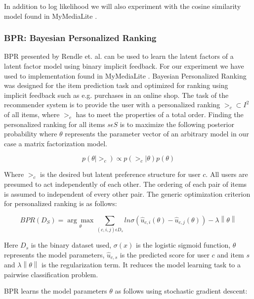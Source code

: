 In addition to log likelihood we will also experiment with the cosine similarity model
found in MyMediaLite \cite{Gantner2011MyMediaLite}.

\subsubsection{BPR: Bayesian Personalized Ranking}

BPR presented by Rendle et. al. \cite{Rendle2009} can be used to learn the latent factors of a
latent factor model using binary implicit feedback. For our experiment we have used to implementation
found in MyMediaLite \cite{Gantner2011MyMediaLite}. Bayesian Personalized Ranking was designed for the item
prediction task and optimized for ranking using implicit feedback such as e.g. purchases in an online shop.
The task of the recommender system is to provide the user with a personalized ranking $>_c \subset I^2$ of all
items, where $>_c$ has to meet the properties of a total order. Finding the personalized ranking for all items
$s \epsilon S$ is to maximize the following posterior probability where $\theta$ represents the parameter vector
of an arbitrary model in our case a matrix factorization model.

\begin{equation}
p(\theta | >_c) \propto p(>_c | \theta) p(\theta)
\end{equation}

Where $>_c$ is the desired but latent preference structure for user $c$. All users are presumed to act
independently of each other. The ordering of each pair of items is assumed to independent of every other pair.
The generic optimization criterion for personalized ranking is as follows:

\begin{equation}
BPR(D_S) = \underset{\theta}{\arg\max} \sum_{(c,i,j)\epsilon D_s} ln \sigma(\hat{u}_{c,i}(\theta)-\hat{u}_{c,j}(\theta)) - \lambda \left\|\theta \right\|
\end{equation}

Here $D_s$ is the binary dataset used, $\sigma(x)$ is the logistic sigmoid function, $\theta$ represents
the model parameters, $\hat{u}_{c,s}$ is the predicted score for user $c$ and item $s$ and
$\lambda \left\|\theta \right\|$ is the regularization term. It reduces the model learning task to
a pairwise classification problem.\newline

BPR learns the model parameters $\theta$ as follows using stochastic gradient descent:


